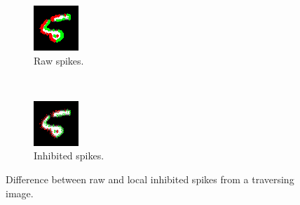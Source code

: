 \documentclass[conference]{IEEEtran}
\begin{document}
\begin{figure}[htb]
  \captionsetup[subfigure]{justification=centering}
  \centering
  \begin{subfigure}[b]{0.2\textwidth}
    \includegraphics[width=\textwidth]{pre_inh_frame_262}
    \caption{Raw spikes.}
    \label{fig:pre_inh}
  \end{subfigure}
  ~
  \begin{subfigure}[b]{0.2\textwidth}
    \includegraphics[width=\textwidth]{post_inh_frame_262}
    \caption{Inhibited spikes.}
    \label{fig:post_inh}
  \end{subfigure}

  \caption[Difference between raw and local inhibited spikes from a traversing image.]{Difference between raw and local inhibited spikes from a traversing image.}
  \label{fig:inh_diff}
\end{figure}
\end{document}

